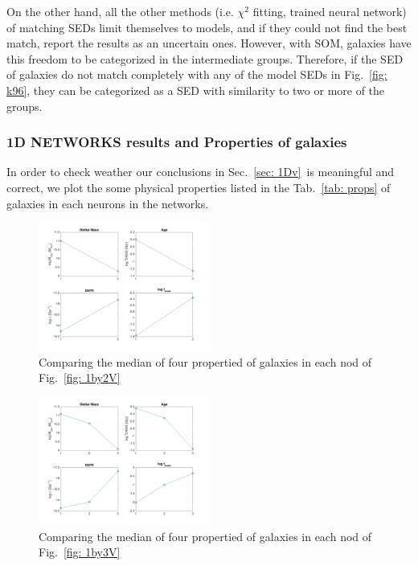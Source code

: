             On the other hand, all the other methods (i.e. $\chi^2$ fitting, trained neural network) of matching SEDs limit themselves to models, and if they could not find the best match, report the results as an uncertain ones.
            However, with SOM, galaxies have this freedom to be categorized in the intermediate groups.
            Therefore, if the SED of galaxies do not match completely with any of the model SEDs in Fig.~\ref{fig: k96}, they can be categorized as a SED with similarity to two or more of the groups.

                        
        
        
        \subsubsection{1D NETWORKS results and Properties of galaxies}
        In order to check weather our conclusions in Sec.~\ref{sec: 1Dv}~is meaningful and correct, we plot the some physical properties listed in the Tab.~\ref{tab: props} of galaxies in each neurons in the networks.
        
        \begin{figure}
            \centering
            \includegraphics[width=0.5\textwidth]{../images/1d/prop1_by_2.png}
            \caption{Comparing the median of four propertied of galaxies in each nod of Fig.~\ref{fig: 1by2V}}
            \label{fig: prop1by2}
        \end{figure}
        
                \begin{figure}
            \centering
            \includegraphics[width=0.5\textwidth]{../images/1d/prop1_by_3.png}
            \caption{Comparing the median of four propertied of galaxies in each nod of Fig.~\ref{fig: 1by3V}}
            \label{fig: prop1by3}
        \end{figure}
        
